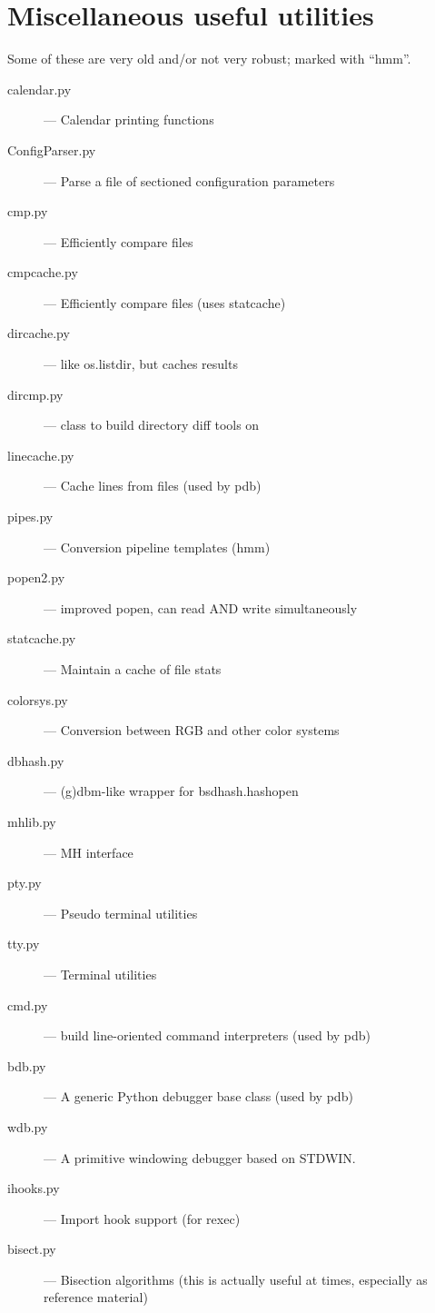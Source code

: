 \section{Miscellaneous useful utilities}

Some of these are very old and/or not very robust; marked with ``hmm''.

\begin{description}
\item[calendar.py]
--- Calendar printing functions

\item[ConfigParser.py]
--- Parse a file of sectioned configuration parameters

\item[cmp.py]
--- Efficiently compare files

\item[cmpcache.py]
--- Efficiently compare files (uses statcache)

\item[dircache.py]
--- like os.listdir, but caches results

\item[dircmp.py]
--- class to build directory diff tools on

\item[linecache.py]
--- Cache lines from files (used by pdb)

\item[pipes.py]
--- Conversion pipeline templates (hmm)

\item[popen2.py]
--- improved popen, can read AND write simultaneously

\item[statcache.py]
--- Maintain a cache of file stats

\item[colorsys.py]
--- Conversion between RGB and other color systems

\item[dbhash.py]
--- (g)dbm-like wrapper for bsdhash.hashopen

\item[mhlib.py]
--- MH interface

\item[pty.py]
--- Pseudo terminal utilities

\item[tty.py]
--- Terminal utilities

\item[cmd.py]
--- build line-oriented command interpreters (used by pdb)

\item[bdb.py]
--- A generic Python debugger base class (used by pdb)

\item[wdb.py]
--- A primitive windowing debugger based on STDWIN.

\item[ihooks.py]
--- Import hook support (for rexec)

\item[bisect.py]
--- Bisection algorithms (this is actually useful at times,
especially as reference material)
\end{description}


